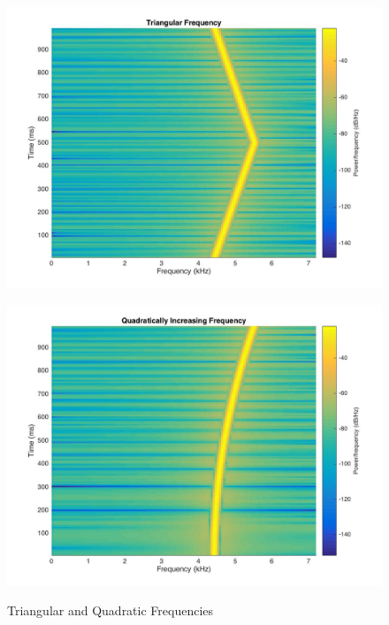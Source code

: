 \documentclass{article}
\begin{document}
\begin{figure}[!htb]
    \centering
    \begin{minipage}{.5\textwidth}
        \centering
        \includegraphics[width=1.0\linewidth, height=0.2\textheight]{part2triangle.jpg}

        \label{fig:prob1_6_2}
    \end{minipage}%
    \begin{minipage}{0.5\textwidth}
        \centering
        \includegraphics[width=1\linewidth, height=0.2\textheight]{part2quad.jpg}

        \label{fig:prob1_6_1}
    \end{minipage}
    \caption{Triangular and Quadratic Frequencies}
\end{figure}
\end{document}
